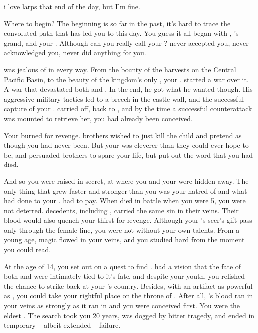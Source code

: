 i love larps that end of the day, but I'm fine.\documentclass[char]{NeptuneBall}
\begin{document}
\name{\cManta{}}



Where to begin? The beginning is so far in the past, it's hard to trace the convoluted path that has led you to this day. You guess it all began with \cExExKing{\King} \cExExKing{}, \cExExKing{\King} \cKing{}'s grand\cExExKing{\parent}, and your \cExExKing{\parent}. Although can you really call \cExExKing{\them} your \cExExKing{\parent}? \cExExKing{\They} never accepted you, never acknowledged you, never did anything for you.

\cExExKing{\They} was jealous of \pPacifica{} in every way. From the bounty of the harvests on the Central Pacific Basin, to the beauty of the kingdom's only \cMother{\prince}, your \cMother{\parent} \cMother{\MYname}. \cExExKing{} started a war over it. A war that devastated both \pPacifica{} and \pAtlantis{}. In the end, he got what he wanted though. His aggressive military tactics led to a breech in the castle wall, and the successful capture of your \cMother{\parent}. \cExExKing{} carried \cMother{\them} off, back to \pAtlantis{}, and by the time a successful counterattack was mounted to retrieve her, you had already been conceived.

Your \cMother{\parent} burned for revenge. \cMother{\Them} brothers wished to just kill the child and pretend as though you had never been. But your \cMother{\parent} was cleverer than they could ever hope to be, and persuaded \cMother{\them} brothers to spare your life, but put out the word that you had died.

And so you were raised in secret, at \pAssassin{} where you and your \cMother{\parent} were hidden away. The only thing that grew faster and stronger than you was your hatred of \pAtlantis{} and what \cExExKing{} had done to your \cMother{\parent}. \cExExKing{} had to pay. When \cExExKing{\they} died in battle when you were 5, you were not deterred. \cExExKing{\Their} decedents, including \cExKing{}, carried the same sin in their veins. Their blood would also quench your thirst for revenge. Although your \cMother{\parent}'s seer's gift pass only through the female line, you were not without your own talents. From a young age, magic flowed in your veins, and you studied hard from the moment you could read.

At the age of 14, you set out on a quest to find \iTrident{\MYname}. \cMother{} had a vision that the fate of both \pPacifica{} and \pAtlantis{} were intimately tied to it's fate, and despite your youth, you relished the chance to strike back at your \cExExKing{\parent}'s country. Besides, with an artifact as powerful as \iTrident{\MYname}, you could take your rightful place on the throne of \pAtlantis{}. After all, \cExExKing{}'s blood ran in your veins as strongly as it ran in \cExKing{} and you were conceived first. You were the eldest \cManta{\offspring}. The search took you 20 years, was dogged by bitter tragedy, and ended in temporary -- albeit extended -- failure. 
\end{document}
